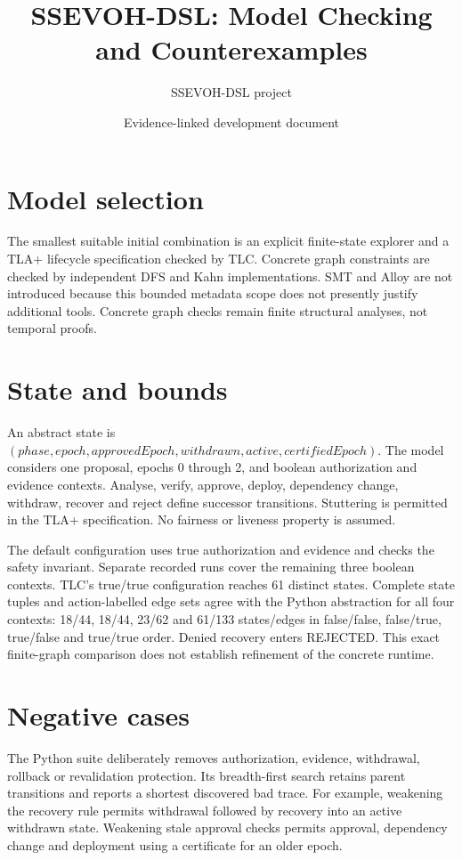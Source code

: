 \documentclass[11pt]{article}
\title{SSEVOH-DSL: Model Checking and Counterexamples}
\author{SSEVOH-DSL project}
\date{Evidence-linked development document}
\begin{document}
\maketitle

\section{Model selection}
The smallest suitable initial combination is an explicit finite-state explorer and a TLA+ lifecycle specification checked by TLC. Concrete graph constraints are checked by independent DFS and Kahn implementations. SMT and Alloy are not introduced because this bounded metadata scope does not presently justify additional tools. Concrete graph checks remain finite structural analyses, not temporal proofs.

\section{State and bounds}
An abstract state is $(phase,epoch,approvedEpoch,withdrawn,active,certifiedEpoch)$. The model considers one proposal, epochs 0 through 2, and boolean authorization and evidence contexts. Analyse, verify, approve, deploy, dependency change, withdraw, recover and reject define successor transitions. Stuttering is permitted in the TLA+ specification. No fairness or liveness property is assumed.

The default configuration uses true authorization and evidence and checks the safety invariant. Separate recorded runs cover the remaining three boolean contexts. TLC's true/true configuration reaches 61 distinct states. Complete state tuples and action-labelled edge sets agree with the Python abstraction for all four contexts: 18/44, 18/44, 23/62 and 61/133 states/edges in false/false, false/true, true/false and true/true order. Denied recovery enters REJECTED. This exact finite-graph comparison does not establish refinement of the concrete runtime.

\section{Negative cases}
The Python suite deliberately removes authorization, evidence, withdrawal, rollback or revalidation protection. Its breadth-first search retains parent transitions and reports a shortest discovered bad trace. For example, weakening the recovery rule permits withdrawal followed by recovery into an active withdrawn state. Weakening stale approval checks permits approval, dependency change and deployment using a certificate for an older epoch.
\end{document}
